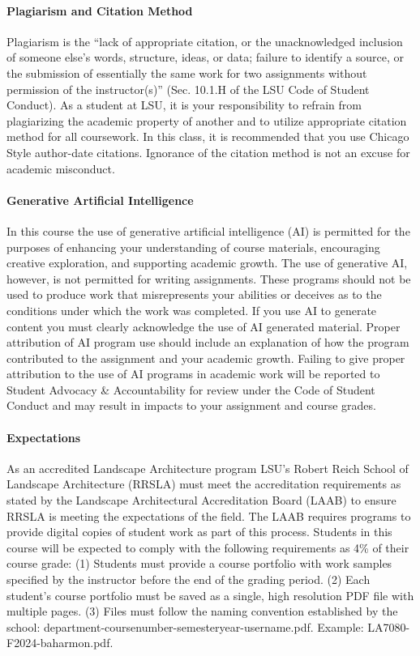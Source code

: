 \documentclass[11pt,article,oneside]{memoir}
\begin{document}
\paragraph{Plagiarism and Citation Method}
Plagiarism is the 
``lack of appropriate citation, or the unacknowledged inclusion 
of someone else's words, structure, ideas, or data; 
failure to identify a source, 
or the submission of essentially the same work 
for two assignments without permission of the instructor(s)'' 
(Sec. 10.1.H of the LSU Code of Student Conduct). 
As a student at LSU, 
it is your responsibility to refrain from 
plagiarizing the academic property of another 
and to utilize appropriate citation method for all coursework. 
In this class, it is recommended that you use 
Chicago Style author-date citations. 
Ignorance of the citation method
 is not an excuse for academic misconduct.

\paragraph{Generative Artificial Intelligence}
In this course the use of generative artificial intelligence (AI) 
is permitted for the purposes of enhancing your understanding 
of course materials, encouraging creative exploration, 
and supporting academic growth. 
The use of generative AI, however, 
is not permitted for writing assignments. 
These programs should not be used to produce work 
that misrepresents your abilities 
or deceives as to the conditions 
under which the work was completed. 
If you use AI to generate content 
you must clearly acknowledge the use of AI generated material. 
Proper attribution of AI program use
should include an explanation of how the program 
contributed to the assignment and your academic growth. 
Failing to give proper attribution 
to the use of AI programs in academic work
 will be reported to Student Advocacy \& Accountability 
 for review under the Code of Student Conduct 
 and may result in impacts to your assignment and course grades.

\paragraph{Expectations}
As an accredited Landscape Architecture program
LSU's Robert Reich School of Landscape Architecture (RRSLA) 
must meet the accreditation requirements 
as stated by the Landscape Architectural Accreditation
Board (LAAB) to ensure RRSLA
 is meeting the expectations of the field. 
The LAAB requires programs to provide digital copies 
of student work as part of this process.
Students in this course will be expected 
to comply with the following requirements
as 4\% of their course grade: 
(1) Students must provide a course portfolio
with work samples specified by the instructor 
before the end of the grading period. 
(2) Each student's course portfolio must be saved as 
a single, high resolution PDF file with multiple pages. 
(3) Files must follow the naming convention
established by the school: 
department-coursenumber-semesteryear-username.pdf.
Example: LA7080-F2024-baharmon.pdf.
\end{document}

